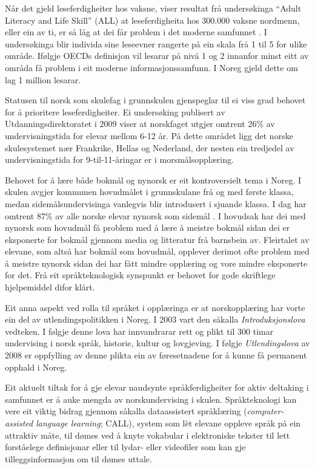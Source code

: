 \begin{multicols}{2}
Når det gjeld leseferdigheiter hos vaksne, viser resultat frå undersøkinga ``Adult Literacy and Life Skill'' (ALL) at leseferdigheita hos 300.000 vaksne nordmenn, eller ein av ti, er så låg at dei får problem i det moderne samfunnet  \cite{gab:2005}. 
I undersøkinga blir individa sine leseevner rangerte på ein skala frå 1 til 5 for ulike område. Ifølgje OECDs definisjon vil lesarar på nivå 1 og 2 innanfor minst eitt av områda få problem i eit moderne informasjonssamfunn. I Noreg gjeld dette om lag 1 million lesarar. 

Statusen til norsk som skulefag i grunnskulen gjenspeglar til ei viss grad behovet for å prioritere leseferdigheiter. Ei undersøking publisert av Utdanningsdirektoratet i 2009 viser at norskfaget utgjer omtrent 26\% av undervisningstida for elevar mellom 6-12 år. 
På dette området ligg det norske skulesystemet nær Frankrike, Hellas og Nederland, der nesten ein tredjedel av undervisningstida for 9-til-11-åringar er i morsmålsopplæring.

Behovet for å lære både bokmål og nynorsk er eit kontroversielt tema i Noreg. I skulen avgjer kommunen hovudmålet i grunnskulane frå og med første klassa, medan sidemålsundervisinga vanlegvis blir introdusert i sjuande klassa. I dag har omtrent 87\% av alle norske elevar nynorsk som sidemål \cite{SR:2010}. %
I hovudsak har dei med nynorsk som hovudmål få problem med å lære å meistre bokmål sidan dei er eksponerte for bokmål gjennom media og litteratur frå barnsbein av. Fleirtalet av elevane, som altså har bokmål som hovudmål, opplever derimot ofte problem med å meistre nynorsk sidan dei har fått mindre opplæring og vore mindre eksponerte for det. Frå eit språkteknologisk synspunkt er behovet for gode skriftlege hjelpemiddel difor klårt. 

Eit anna aspekt ved rolla til språket i opplæringa er at norskopplæring har vorte ein del av utlendingspolitikken i Noreg. 
I 2003 vart den såkalla \textit{Introduksjonslova} vedteken. I følgje denne lova har innvandrarar rett og plikt til 300 timar undervising i norsk språk, historie, kultur og lovgjeving. 
I følgje \textit{Utlendingslova} av 2008 er oppfylling av denne plikta ein av føresetnadene for å kunne få permanent opphald i Noreg. 

Eit aktuelt tiltak for å gje elevar naudsynte språkferdigheiter for aktiv deltaking i samfunnet er å auke mengda av norskundervising i skulen. 
Språkteknologi kan vere eit viktig bidrag gjennom såkalla dataassistert språklæring (\textit{computer-assisted language learning}; CALL), system som lèt elevane oppleve språk på ein attraktiv måte, til dømes ved å knyte vokabular i elektroniske tekster til lett forståelege definisjonar eller til lydar- eller videofiler som kan gje tilleggsinformasjon om til dømes uttale. 


\end{multicols}
